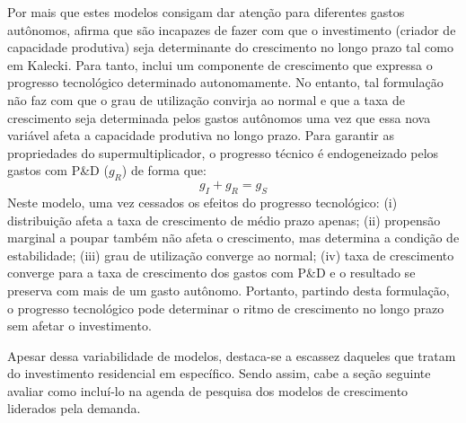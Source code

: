 Por mais que estes modelos consigam dar atenção para diferentes gastos autônomos, \textcite{dutt_observations_2018} afirma que são incapazes de fazer com que o investimento (criador de capacidade produtiva) seja determinante do crescimento no longo prazo tal como em Kalecki. Para tanto, inclui um componente de crescimento que expressa o progresso tecnológico determinado autonomamente. No entanto, tal formulação não faz com que o grau de utilização convirja ao normal e que a taxa de crescimento seja determinada pelos gastos autônomos uma vez que essa nova variável afeta a capacidade produtiva no longo prazo. Para garantir as propriedades do supermultiplicador, o progresso técnico é endogeneizado pelos gastos com P\&D ($g_R$) de forma que:
$$
g_I + g_R = g_S
$$
Neste modelo, uma vez cessados os efeitos do progresso tecnológico: 
	(i) distribuição afeta a taxa de crescimento de médio prazo apenas; 
	(ii) propensão marginal a poupar também não afeta o crescimento, mas determina a condição de estabilidade; 
	(iii) grau de utilização converge ao normal; 
	(iv) taxa de crescimento converge para a taxa de crescimento dos gastos com P\&D e o resultado se preserva com mais de um gasto autônomo. 
Portanto, partindo desta formulação, o progresso tecnológico pode determinar o ritmo de crescimento no longo prazo sem afetar o investimento.

Apesar dessa variabilidade de modelos, destaca-se a escassez daqueles que tratam do investimento residencial em específico. 
Sendo assim, cabe a seção seguinte avaliar como incluí-lo na agenda de pesquisa dos modelos de crescimento liderados pela demanda.

